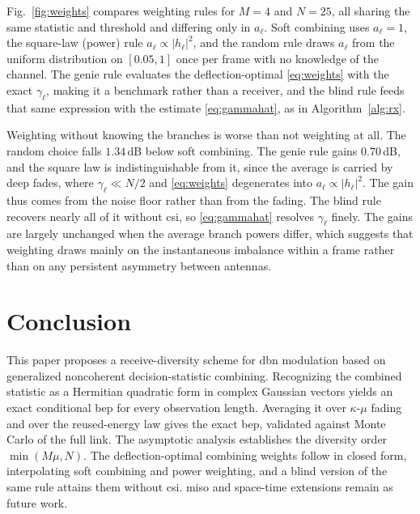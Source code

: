 \documentclass[12pt, draftclsnofoot, onecolumn]{IEEEtran}
\newenvironment{revblock}{}{}
\begin{document}
\begin{revblock}
Fig.~\ref{fig:weights} compares weighting rules for $M=4$ and $N=25$, all
sharing the same statistic and threshold and differing only in $a_\ell$. Soft
combining uses $a_\ell=1$, the square-law (power) rule $a_\ell\propto|h_\ell|^2$, and
the random rule draws $a_\ell$ from the uniform distribution on $[0.05,1]$ once per frame with no
knowledge of the channel. The genie rule evaluates the deflection-optimal
\eqref{eq:weights} with the exact $\gamma_\ell$, making it a benchmark rather
than a receiver, and the blind rule feeds that same expression with the estimate
\eqref{eq:gammahat}, as in Algorithm~\ref{alg:rx}.

Weighting without knowing the branches is worse than not weighting
at all. The random choice falls $1.34$\,dB below soft combining. The genie rule
gains $0.70$\,dB, and the square law is indistinguishable from it, since
the average is carried by deep fades, where $\gamma_\ell\ll N/2$ and
\eqref{eq:weights} degenerates into $a_\ell\propto|h_\ell|^2$. The gain thus
comes from the noise floor rather than from the fading. The blind rule
recovers nearly all of it without \ac{csi}, so \eqref{eq:gammahat} resolves
$\gamma_\ell$ finely. The gains are largely unchanged when the average branch
powers differ, which suggests that weighting draws mainly on the instantaneous
imbalance within a frame rather than on any persistent asymmetry between
antennas.


\end{revblock}

\section{Conclusion}
\label{sec:conclusion}

\begin{revblock}
This paper proposes a receive-diversity scheme for \ac{dbn} modulation based
on generalized noncoherent decision-statistic combining. Recognizing the
combined statistic as a Hermitian quadratic form in complex Gaussian vectors
yields an exact conditional \ac{bep} for every observation length. Averaging it
over $\kappa$-$\mu$ fading and over the reused-energy law gives the exact
\ac{bep}, validated against Monte Carlo of the full link. The asymptotic
analysis establishes the diversity order $\min(M\mu,N)$. The deflection-optimal
combining weights follow in closed form, interpolating soft combining and power
weighting, and a blind version of the same rule attains them without \ac{csi}. \Ac{miso}
and space-time extensions remain as future work.
\end{revblock}




\end{document}
